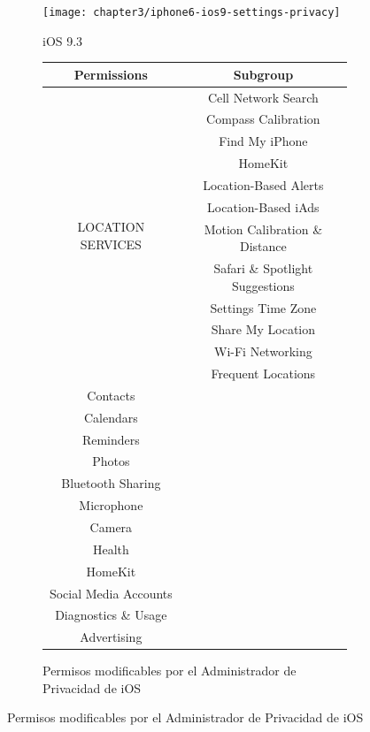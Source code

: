 \begin{figure}[!pb]
	\begin{subfigure}{.4\textwidth}
		\centering
		\texttt{[image: chapter3/iphone6-ios9-settings-privacy]}
    		\caption{iOS 9.3}
   		\label{fig:chapter03:iospermCapture}
	\end{subfigure}
	\begin{subfigure}{.55\textwidth}
	    \centering	
		\begin{tabular}{|c|c|}
			\hline
			\rowcolor{gray!50}
			Permissions		 					& Subgroup\\ \hline
			\multirow{12}{*}{LOCATION SERVICES} 	& Cell Network Search \\
								 				& Compass Calibration \\
												& Find My iPhone \\
												& HomeKit \\
												& Location-Based Alerts \\
												& Location-Based iAds \\
												& Motion Calibration \& Distance \\
												& Safari \& Spotlight Suggestions \\
												& Settings Time Zone\\
												& Share My Location \\
												& Wi-Fi Networking \\
												& Frequent Locations \\ \hline
			Contacts				& \\ \hline
			Calendars			& \\ \hline
			Reminders			& \\ \hline
			Photos				& \\ \hline
			Bluetooth Sharing 	& \\ \hline
			Microphone 			& \\ \hline
			Camera 				& \\ \hline
			Health 				& \\ \hline
			HomeKit 				& \\ \hline
			Social Media Accounts& \\ \hline
			Diagnostics \& Usage	& \\ \hline		
			Advertising			& \\ \hline
		\end{tabular}
		\caption{Permisos modificables por el Administrador de Privacidad de iOS}
		\label{tab:chapter03:iosperm}
	\end{subfigure}
\end{figure}
